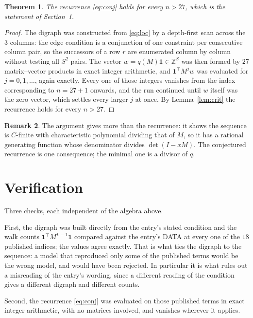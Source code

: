 \documentclass[11pt,a4paper]{article}
\theoremstyle{plain}
\newtheorem{theorem}{Theorem}
\theoremstyle{definition}
\newtheorem{remark}[theorem]{Remark}
\begin{document}
\begin{theorem}
The recurrence \eqref{eq:conj} holds for every $n>27$, which is the statement of
Section~1.
\end{theorem}

\begin{proof}
The digraph was constructed from \eqref{eq:loc} by a depth-first scan across the $3$
columns: the edge condition is a conjunction of one constraint per consecutive column
pair, so the successors of a row $r$ are enumerated column by column without testing all
$S^2$ pairs. The vector $w=q(M)\mathbf{1}\in\mathbb{Z}^{S}$ was then formed by $27$
matrix--vector products in exact integer arithmetic, and $\mathbf{1}^{\!\top}M^{j}w$ was
evaluated for $j=0,1,\dots$, again exactly. Every one of those integers vanishes from the
index corresponding to $n=27+1$ onwards, and the run continued until $w$ itself was the
zero vector, which settles every larger $j$ at once. By Lemma~\ref{lem:crit} the recurrence
holds for every $n>27$.
\end{proof}

\begin{remark}
The argument gives more than the recurrence: it shows the sequence is $C$-finite with
characteristic polynomial dividing that of $M$, so it has a rational generating function
whose denominator divides $\det(I-xM)$. The conjectured recurrence is one consequence; the
minimal one is a divisor of $q$.
\end{remark}

\section{Verification}

Three checks, each independent of the algebra above.

First, the digraph was built directly from the entry's stated condition and the walk counts
$\mathbf{1}^{\!\top}M^{L-1}\mathbf{1}$ compared against the entry's DATA at
every one of the $18$ published indices; the values agree exactly. That is what ties
the digraph to the sequence: a model that reproduced only some of the published terms would
be the wrong model, and would have been rejected. In particular it is what rules out a
misreading of the entry's wording, since a different reading of the condition gives a
different digraph and different counts.

Second, the recurrence \eqref{eq:conj} was evaluated on those published terms in exact
integer arithmetic, with no matrices involved, and vanishes wherever it applies.
\end{document}

